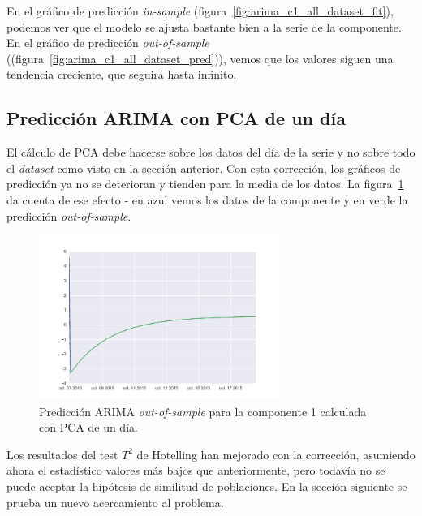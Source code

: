 \documentclass[11pt,spanish,listoffigures,listoftables]{tfgetsinf}
\begin{document}
        En el gráfico de predicción {\em in-sample} (figura~\ref{fig:arima_c1_all_dataset_fit}), podemos ver que el modelo se ajusta bastante bien a la serie de la componente. En el gráfico de predicción {\em out-of-sample} ((figura~\ref{fig:arima_c1_all_dataset_pred})), vemos que los valores siguen una tendencia creciente, que seguirá hasta infinito. 
        
        \subsection{Predicción ARIMA con PCA de un día}
        El cálculo de PCA debe hacerse sobre los datos del día de la serie y no sobre todo el {\em dataset} como visto en la sección anterior. Con esta corrección, los gráficos de predicción ya no se deterioran y tienden para la media de los datos. La  figura~\ref{fig:arima_c1_one_day_pred} da cuenta de ese efecto - en azul vemos los datos de la componente y en verde la predicción {\em out-of-sample}.
        
        \begin{figure}[H]
            \centering
            \includegraphics[width=0.7\textwidth]{arima_c1_one_day_pred.png}
            \caption{Predicción ARIMA {\em out-of-sample} para la componente 1 calculada con PCA de un día.}
            \label{fig:arima_c1_one_day_pred}
        \end{figure}
        
        Los resultados del test \(T^2\) de Hotelling han mejorado con la corrección, asumiendo ahora el estadístico valores más bajos que anteriormente, pero todavía no se puede aceptar la hipótesis de similitud de poblaciones. En la sección siguiente se prueba un nuevo acercamiento al problema.
\end{document}
